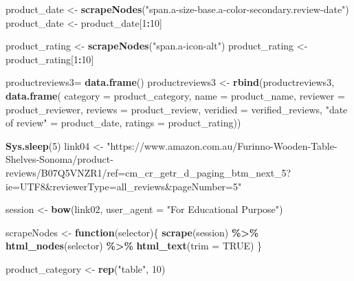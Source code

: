 \documentclass[
]{article}
\newenvironment{Shaded}{\begin{snugshade}}{\end{snugshade}}
\newcommand{\AttributeTok}[1]{\textcolor[rgb]{0.13,0.29,0.53}{#1}}
\newcommand{\ConstantTok}[1]{\textcolor[rgb]{0.56,0.35,0.01}{#1}}
\newcommand{\ControlFlowTok}[1]{\textcolor[rgb]{0.13,0.29,0.53}{\textbf{#1}}}
\newcommand{\DecValTok}[1]{\textcolor[rgb]{0.00,0.00,0.81}{#1}}
\newcommand{\FunctionTok}[1]{\textcolor[rgb]{0.13,0.29,0.53}{\textbf{#1}}}
\newcommand{\NormalTok}[1]{#1}
\newcommand{\OtherTok}[1]{\textcolor[rgb]{0.56,0.35,0.01}{#1}}
\newcommand{\SpecialCharTok}[1]{\textcolor[rgb]{0.81,0.36,0.00}{\textbf{#1}}}
\newcommand{\StringTok}[1]{\textcolor[rgb]{0.31,0.60,0.02}{#1}}
\begin{document}
\begin{Shaded}
\begin{Highlighting}[]
\NormalTok{  product\_date }\OtherTok{\textless{}{-}} \FunctionTok{scrapeNodes}\NormalTok{(}\StringTok{"span.a{-}size{-}base.a{-}color{-}secondary.review{-}date"}\NormalTok{)}
\NormalTok{  product\_date }\OtherTok{\textless{}{-}}\NormalTok{ product\_date[}\DecValTok{1}\SpecialCharTok{:}\DecValTok{10}\NormalTok{]}
  
\NormalTok{  product\_rating }\OtherTok{\textless{}{-}} \FunctionTok{scrapeNodes}\NormalTok{(}\StringTok{"span.a{-}icon{-}alt"}\NormalTok{)}
\NormalTok{  product\_rating }\OtherTok{\textless{}{-}}\NormalTok{ product\_rating[}\DecValTok{1}\SpecialCharTok{:}\DecValTok{10}\NormalTok{]}
  
\NormalTok{  productreviews3}\OtherTok{=} \FunctionTok{data.frame}\NormalTok{()}
\NormalTok{  productreviews3 }\OtherTok{\textless{}{-}} \FunctionTok{rbind}\NormalTok{(productreviews3, }\FunctionTok{data.frame}\NormalTok{(}
                      \AttributeTok{category =}\NormalTok{ product\_category,}
                      \AttributeTok{name =}\NormalTok{ product\_name,}
                      \AttributeTok{reviewer =}\NormalTok{ product\_reviewer,}
                      \AttributeTok{reviews =}\NormalTok{ product\_review,}
                      \AttributeTok{veridied =}\NormalTok{ verified\_reviews,}
                      \StringTok{"date of review"} \OtherTok{=}\NormalTok{ product\_date,}
                      \AttributeTok{ratings =}\NormalTok{ product\_rating))}
  
   \FunctionTok{Sys.sleep}\NormalTok{(}\DecValTok{5}\NormalTok{)}
\NormalTok{link04 }\OtherTok{\textless{}{-}} \StringTok{"https://www.amazon.com.au/Furinno{-}Wooden{-}Table{-}Shelves{-}Sonoma/product{-}reviews/B07Q5VNZR1/ref=cm\_cr\_getr\_d\_paging\_btm\_next\_5?ie=UTF8\&reviewerType=all\_reviews\&pageNumber=5"}


\NormalTok{  session }\OtherTok{\textless{}{-}} \FunctionTok{bow}\NormalTok{(link02,}
               \AttributeTok{user\_agent =} \StringTok{"For Educational Purpose"}\NormalTok{)}

\NormalTok{  scrapeNodes }\OtherTok{\textless{}{-}} \ControlFlowTok{function}\NormalTok{(selector)\{}
    \FunctionTok{scrape}\NormalTok{(session) }\SpecialCharTok{\%\textgreater{}\%}
      \FunctionTok{html\_nodes}\NormalTok{(selector) }\SpecialCharTok{\%\textgreater{}\%}
      \FunctionTok{html\_text}\NormalTok{(}\AttributeTok{trim =} \ConstantTok{TRUE}\NormalTok{)}
\NormalTok{  \}}

\NormalTok{  product\_category }\OtherTok{\textless{}{-}} \FunctionTok{rep}\NormalTok{(}\StringTok{"table"}\NormalTok{, }\DecValTok{10}\NormalTok{)}


\end{Highlighting}
\end{Shaded}
\end{document}
